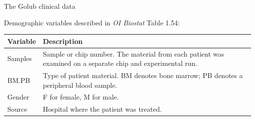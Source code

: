 \documentclass[10pt]{beamer}\usepackage[]{graphicx}\usepackage[]{color}
\begin{document}
						\begin{frame}{The Golub clinical data}
							\protect\hypertarget{the-golub-clinical-data}{}
							
							Demographic variables described in \emph{OI Biostat} Table 1.54:
							
							\scriptsize
							
							\begin{longtable}[]{@{}ll@{}}
								\toprule
								\begin{minipage}[b]{0.12\columnwidth}\raggedright
									Variable\strut
								\end{minipage} & \begin{minipage}[b]{0.82\columnwidth}\raggedright
									Description\strut
								\end{minipage}\tabularnewline
								\midrule
								\endhead
								\begin{minipage}[t]{0.12\columnwidth}\raggedright
									Samples\strut
								\end{minipage} & \begin{minipage}[t]{0.82\columnwidth}\raggedright
									Sample or chip number. The material from each patient was examined on a
									separate chip and experimental run.\strut
								\end{minipage}\tabularnewline
								\begin{minipage}[t]{0.12\columnwidth}\raggedright
									BM.PB\strut
								\end{minipage} & \begin{minipage}[t]{0.82\columnwidth}\raggedright
									Type of patient material. BM denotes bone marrow; PB denotes a
									peripheral blood sample.\strut
								\end{minipage}\tabularnewline
								\begin{minipage}[t]{0.12\columnwidth}\raggedright
									Gender\strut
								\end{minipage} & \begin{minipage}[t]{0.82\columnwidth}\raggedright
									F for female, M for male.\strut
								\end{minipage}\tabularnewline
								\begin{minipage}[t]{0.12\columnwidth}\raggedright
									Source\strut
								\end{minipage} & \begin{minipage}[t]{0.82\columnwidth}\raggedright
									Hospital where the patient was treated.\strut
								\end{minipage}\tabularnewline

\end{longtable}
\end{frame}
\end{document}
